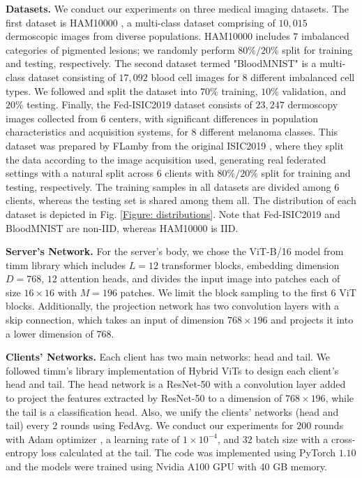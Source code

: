\documentclass[runningheads]{llncs}
\begin{document}
\noindent \textbf{Datasets.} We conduct our experiments on three medical imaging datasets. The first dataset is HAM10000 \cite{HAM1000}, a multi-class dataset comprising of $10,015$ dermoscopic images from diverse populations. HAM10000 includes $7$ imbalanced categories of pigmented lesions; we randomly perform $80\%/20\%$ split for training and testing, respectively. The second dataset \cite{bloodmnist} termed "BloodMNIST" is a multi-class dataset consisting of $17,092$ blood cell images for $8$ different imbalanced cell types. We followed \cite{medmnist} and split the dataset into $70\%$ training, $10\%$ validation, and $20\%$ testing. Finally, the Fed-ISIC2019 dataset consists of $23,247$ dermoscopy images collected from $6$ centers, with significant differences in population characteristics and acquisition systems, for $8$ different melanoma classes. This dataset was prepared by FLamby \cite{flamby} from the original ISIC2019 \cite{HAM1000,HAM2,HAM3}, where they split the data according to the image acquisition used, generating real federated settings with a natural split across $6$ clients with $80\%/20\%$ split for training and testing, respectively. The training samples in all datasets are divided among $6$ clients, whereas the testing set is shared among them all. The distribution of each dataset is depicted in Fig. \ref{Figure: distributions}. Note that Fed-ISIC2019 and BloodMNIST are non-IID, whereas HAM10000 is IID. 

\noindent \textbf{Server's Network.} For the server's body, we chose the ViT-B/16 model from timm library \cite{timm} which includes $L = 12$ transformer blocks, embedding dimension $D = 768$, $12$ attention heads, and divides the input image into patches each of size $16 \times 16$ with $M = 196$ patches. We limit the block sampling to the first $6$ ViT blocks. Additionally, the projection network has two convolution layers with a skip connection, which takes an input of dimension $768 \times 196$ and projects it into a lower dimension of $768$. 

\noindent \textbf{Clients' Networks.} Each client has two main networks: head and tail. We followed timm's library implementation of Hybrid ViTs to design each client's head and tail. The head network is a ResNet-50 \cite{ResNet} with a convolution layer added to project the features extracted by ResNet-50 to a dimension of $768 \times 196$, while the tail is a classification head. Also, we unify the clients' networks (head and tail) every $2$ rounds using FedAvg. We conduct our experiments for $200$ rounds with Adam optimizer \cite{Adam}, a learning rate of $1\times10^{-4}$, and $32$ batch size with a cross-entropy loss calculated at the tail. The code was implemented using PyTorch $1.10$ and the models were trained using Nvidia A100 GPU with 40 GB memory.
\end{document}
